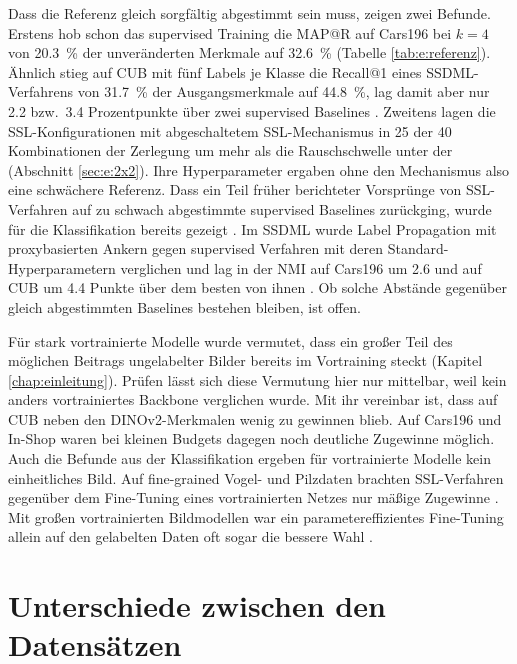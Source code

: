 Dass die Referenz gleich sorgfältig abgestimmt sein muss, zeigen zwei Befunde. Erstens hob schon das supervised Training die \ac{MAP@R} auf Cars196 bei $k=4$ von \qty{20.3}{\percent} der unveränderten Merkmale auf \qty{32.6}{\percent} (Tabelle \ref{tab:e:referenz}). Ähnlich stieg auf \ac{CUB} mit fünf Labels je Klasse die Recall@1 eines \ac{SSDML}-Verfahrens von \qty{31.7}{\percent} der Ausgangsmerkmale auf \qty{44.8}{\percent}, lag damit aber nur \num{2.2} bzw.\ \num{3.4} Prozentpunkte über zwei supervised Baselines \cite{dutta_semi-supervised_2021}. Zweitens lagen die \ac{SSL}-Konfigurationen mit abgeschaltetem \ac{SSL}-Mechanismus in 25 der 40 Kombinationen der Zerlegung um mehr als die Rauschschwelle unter der \UEBL (Abschnitt \ref{sec:e:2x2}). Ihre Hyperparameter ergaben ohne den Mechanismus also eine schwächere Referenz. Dass ein Teil früher berichteter Vorsprünge von \ac{SSL}-Verfahren auf zu schwach abgestimmte supervised Baselines zurückging, wurde für die Klassifikation bereits gezeigt \cite{oliver_realistic_2018}. Im \ac{SSDML} wurde Label Propagation mit proxybasierten Ankern gegen supervised Verfahren mit deren Standard-Hyperparametern verglichen und lag in der \ac{NMI} auf Cars196 um \num{2.6} und auf \ac{CUB} um \num{4.4} Punkte über dem besten von ihnen \cite{zhuang_deep_2021}. Ob solche Abstände gegenüber gleich abgestimmten Baselines bestehen bleiben, ist offen. 

Für stark vortrainierte Modelle wurde vermutet, dass ein großer Teil des möglichen Beitrags ungelabelter Bilder bereits im Vortraining steckt (Kapitel \ref{chap:einleitung}). Prüfen lässt sich diese Vermutung hier nur mittelbar, weil kein anders vortrainiertes Backbone verglichen wurde. Mit ihr vereinbar ist, dass auf \ac{CUB} neben den DINOv2-Merkmalen wenig zu gewinnen blieb. Auf Cars196 und In-Shop waren bei kleinen Budgets dagegen noch deutliche Zugewinne möglich. Auch die Befunde aus der Klassifikation ergeben für vortrainierte Modelle kein einheitliches Bild. Auf fine-grained Vogel- und Pilzdaten brachten \ac{SSL}-Verfahren gegenüber dem Fine-Tuning eines vortrainierten Netzes nur mäßige Zugewinne \cite{su_realistic_2021}. Mit großen vortrainierten Bildmodellen war ein parametereffizientes Fine-Tuning allein auf den gelabelten Daten oft sogar die bessere Wahl \cite{zhang_revisiting_2025}. 

\section{Unterschiede zwischen den Datensätzen}
\label{sec:d:datensaetze}


